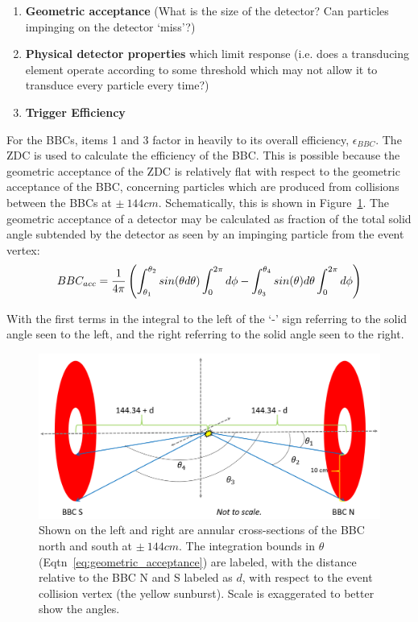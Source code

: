 \begin{enumerate}
  \item \textbf{Geometric acceptance} (What is the size of the detector? Can particles
    impinging on the detector `miss'?)
  \item \textbf{Physical detector properties} which limit response (i.e. does a
    transducing element operate according to some threshold which may not allow
    it to transduce every particle every time?)
  \item \textbf{Trigger Efficiency}
\end{enumerate}

{\noindent}For the BBCs, items 1 and 3 factor in heavily to its overall
efficiency, $\epsilon_{BBC}$. The ZDC is used to calculate the efficiency of the
BBC. This is possible because the geometric acceptance of the ZDC is relatively
flat with respect to the geometric acceptance of the BBC, concerning particles
which are produced from collisions between the BBCs at $\pm~144cm$.
Schematically, this is shown in Figure~\ref{fig:bbc_geometric_acceptance}. The
geometric acceptance of a detector may be calculated as fraction of the total
solid angle subtended by the detector as seen by an impinging particle from the
event vertex:
\begin{equation}
  BBC_{acc} = {1\over{4\pi}}\left(\int_{\theta_1}^{\theta_2}sin(\theta
    d\theta)\int_{0}^{2\pi}d\phi-\int_{\theta_3}^{\theta_4}sin(\theta)d\theta
    \int_{0}^{2\pi}d\phi\right)
    \label{eq:geometric_acceptance}
\end{equation}

{\noindent}With the first terms in the integral to the left of the `-' sign referring to
the solid angle seen to the left, and the right referring to the solid angle
seen to the right. 

\begin{figure}[hp]
  \centering
  \includegraphics[width=\linewidth]{./figures/geometric_acceptance_noeq.png}
  \caption{
    Shown on the left and right are annular cross-sections of the BBC north and
    south at $\pm~144cm$. The integration bounds in $\theta$
    (Eqtn~\ref{eq:geometric_acceptance}) are labeled, with the distance relative
    to the BBC N and S labeled as $d$, with respect to the event collision vertex
    (the yellow sunburst). Scale is exaggerated to better show the angles.
  }
  \label{fig:bbc_geometric_acceptance}
\end{figure}

